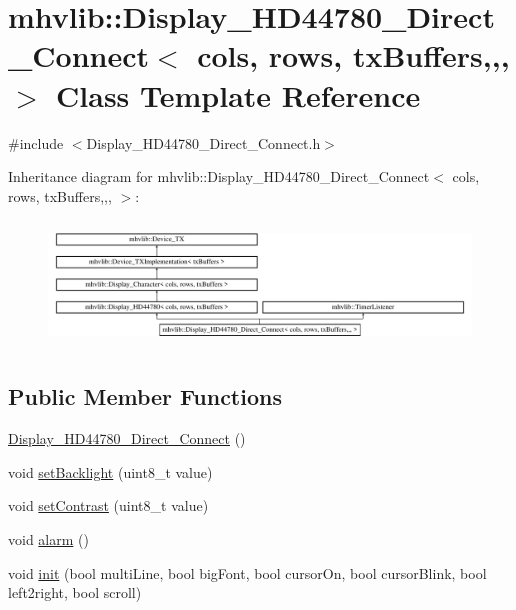 \hypertarget{classmhvlib_1_1_display___h_d44780___direct___connect}{\section{mhvlib\-:\-:Display\-\_\-\-H\-D44780\-\_\-\-Direct\-\_\-\-Connect$<$ cols, rows, tx\-Buffers,,, $>$ Class Template Reference}
\label{classmhvlib_1_1_display___h_d44780___direct___connect}
}


{\ttfamily \#include $<$Display\-\_\-\-H\-D44780\-\_\-\-Direct\-\_\-\-Connect.\-h$>$}

Inheritance diagram for mhvlib\-:\-:Display\-\_\-\-H\-D44780\-\_\-\-Direct\-\_\-\-Connect$<$ cols, rows, tx\-Buffers,,, $>$\-:\begin{figure}[H]
\begin{center}
\leavevmode
\includegraphics[height=3.389831cm]{classmhvlib_1_1_display___h_d44780___direct___connect}
\end{center}
\end{figure}
\subsection*{Public Member Functions}
\begin{DoxyCompactItemize}
\item 
\hyperlink{classmhvlib_1_1_display___h_d44780___direct___connect_a3501100dbececb7bf23176b4a99bc90b}{Display\-\_\-\-H\-D44780\-\_\-\-Direct\-\_\-\-Connect} ()
\item 
void \hyperlink{classmhvlib_1_1_display___h_d44780___direct___connect_ad1b209278967ce1c0155cb6f5cbaed95}{set\-Backlight} (uint8\-\_\-t value)
\item 
void \hyperlink{classmhvlib_1_1_display___h_d44780___direct___connect_a265514fd35c3224d25a5e154ca8214de}{set\-Contrast} (uint8\-\_\-t value)
\item 
void \hyperlink{classmhvlib_1_1_display___h_d44780___direct___connect_ab26b7baf1564243097514b1ac0e26b09}{alarm} ()
\item 
void \hyperlink{classmhvlib_1_1_display___h_d44780___direct___connect_a6a8af108854389777103e778ab3642ac}{init} (bool multi\-Line, bool big\-Font, bool cursor\-On, bool cursor\-Blink, bool left2right, bool scroll)
\end{DoxyCompactItemize}
